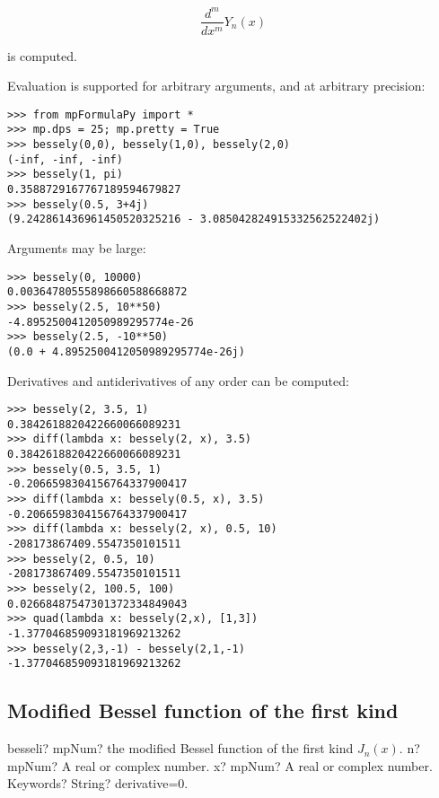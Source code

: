 \begin{equation}
\frac{d^m}{dx^m} Y_n(x)
\end{equation}

is computed.

Evaluation is supported for arbitrary arguments, and at arbitrary precision:

\begin{lstlisting}
>>> from mpFormulaPy import *
>>> mp.dps = 25; mp.pretty = True
>>> bessely(0,0), bessely(1,0), bessely(2,0)
(-inf, -inf, -inf)
>>> bessely(1, pi)
0.3588729167767189594679827
>>> bessely(0.5, 3+4j)
(9.242861436961450520325216 - 3.085042824915332562522402j)
\end{lstlisting}

Arguments may be large:

\begin{lstlisting}
>>> bessely(0, 10000)
0.00364780555898660588668872
>>> bessely(2.5, 10**50)
-4.8952500412050989295774e-26
>>> bessely(2.5, -10**50)
(0.0 + 4.8952500412050989295774e-26j)
\end{lstlisting}


Derivatives and antiderivatives of any order can be computed:

\begin{lstlisting}
>>> bessely(2, 3.5, 1)
0.3842618820422660066089231
>>> diff(lambda x: bessely(2, x), 3.5)
0.3842618820422660066089231
>>> bessely(0.5, 3.5, 1)
-0.2066598304156764337900417
>>> diff(lambda x: bessely(0.5, x), 3.5)
-0.2066598304156764337900417
>>> diff(lambda x: bessely(2, x), 0.5, 10)
-208173867409.5547350101511
>>> bessely(2, 0.5, 10)
-208173867409.5547350101511
>>> bessely(2, 100.5, 100)
0.02668487547301372334849043
>>> quad(lambda x: bessely(2,x), [1,3])
-1.377046859093181969213262
>>> bessely(2,3,-1) - bessely(2,1,-1)
-1.377046859093181969213262
\end{lstlisting}



\subsection{Modified Bessel function of the  first kind}

\begin{mpFunctionsExtract}
	\mpFunctionThree
	{besseli? mpNum? the modified Bessel function of the first kind $J_n(x)$.}
	{n? mpNum? A real or complex number.}
	{x? mpNum? A real or complex number.}	
	{Keywords? String? derivative=0.}	
\end{mpFunctionsExtract}



